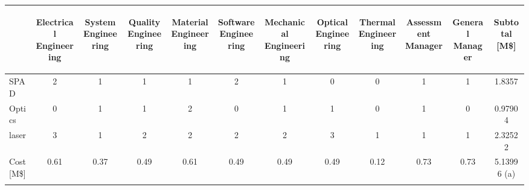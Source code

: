 \begin{table}[ht!]
\centering
\begin{tabular}{p{0.9in}|cccccccccc||c}
&\begin{sideways}Electrical Engineering\end{sideways} 
&\begin{sideways}System Engineering\end {sideways} 
&\begin{sideways}Quality Engineering\end{sideways} 
&\begin{sideways}Material Engineering\end{sideways} 
&\begin{sideways}Software Engineering\end{sideways} 
&\begin{sideways}Mechanical Engineering\end{sideways} 
&\begin{sideways}Optical Engineering\end{sideways} 
&\begin{sideways}Thermal Engineering\end{sideways}
&\begin{sideways}Assessment Manager\end{sideways}
&\begin{sideways}General Manager\end{sideways}
&\begin{sideways}Subtotal [M\$]\end{sideways}\\\hline
\acs{SPAD} &2 &1 &1 &1 &2 &1 &0 &0 &1 &1 &1.8357 \\
Optics &0 &1 &1 &2 &0 &1 &1 &0 &1 &0 &0.97904 \\
\acs{laser} &3 &1 &2 &2 &2 &2 &3 &1 &1 &1 &2.32522 \\ \hline \hline 
Cost [M\$] &0.61 &0.37 &0.49 &0.61 &0.49 &0.49 &0.49 &0.12 &0.73 &0.73 &5.13996 (a) \\\hline\\


\end{tabular}
\end{table}

